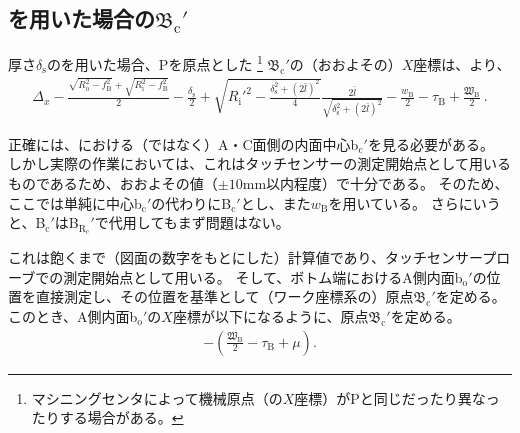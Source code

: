 \subsection[\Spacer を用いた場合の\texorpdfstring{$\mathfrak B_\mathrm c'$}{Bc'}]
           {\Spacer を用いた場合の$\boldsymbol{\mathfrak B_\mathrm c'}$}
厚さ$\delta_\mathrm s$の\Spacer を用いた場合、\TableCenter Pを原点とした
\footnote{マシニングセンタによって機械原点（の$X$座標）が\TableCenter Pと同じだったり異なったりする場合がある。}\relax
\BottomOutcutCenter$\mathfrak B_\mathrm c'$の（おおよその）$X$座標は、より、
\begin{align*}
  \Delta_x-\frac{\sqrt{R_\mathrm o^2-f_\mathrm B^2}+\sqrt{R_\mathrm i^2-f_\mathrm B^2}}2-\frac{\delta_\mathrm s}2
  +\sqrt{R_\mathrm i'^2-\frac{\delta_\mathrm s^2+(2\bar l)^2}4}\frac{2\bar l}{\sqrt{\delta_\mathrm s^2+(2\bar l)^2}}
  -\frac{w_\mathrm B}2-\tau_\mathrm B+\frac{\mathfrak W_\mathrm B}2\ .
\end{align*}
\begin{hosoku}
正確には、\nameBottomEndFace における（\InnerDiameter ではなく）A・C面側の内面中心b$_\mathrm c'$を見る必要がある。
しかし実際の作業においては、これはタッチセンサーの測定開始点として用いるものであるため、おおよその値（$\pm10$mm以内程度）で十分である。
そのため、ここでは単純に中心b$_\mathrm c'$の代わりに\BottomODCenter B$_\mathrm c'$とし、また\BottomEndACID$w_\mathrm B$を用いている。
さらにいうと、\BottomODCenter B$_\mathrm c'$は\BottomCurvatureCenter B$_{\mathrm R_\mathrm c}'$で代用してもまず問題はない。
\end{hosoku}
これは飽くまで（図面の数字をもとにした）計算値であり、タッチセンサープローブでの測定開始点として用いる。
そして、ボトム端におけるA側内面b$_\mathrm o'$の位置を直接測定し、その位置を基準として（ワーク座標系の）原点$\mathfrak B_\mathrm c'$を定める。
このとき、A側内面b$_\mathrm o'$の$X$座標が以下になるように、原点$\mathfrak B_\mathrm c'$を定める。
\begin{align*}
  -\left(\frac{\mathfrak W_\mathrm B}2-\tau_\mathrm B+\mu\right).
\end{align*}

